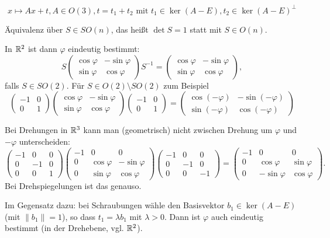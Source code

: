 \documentclass[
 a4paper,
 12pt,
 parskip=half
 ]{scrartcl}
\theoremstyle{plain}
\theoremstyle{definition}
\begin{document}
 \[ x \mapsto Ax + t, A \in O(3), t = t_1 + t_2 \text{ mit } t_1 \in \ker(A-E), t_2 \in \ker(A-E)^\bot \]

\begin{bem}
Äquivalenz über $S \in SO(n)$, das heißt $\det S=1$ statt mit $S \in O(n)$. 
 
 In $\mathbb{R}^2$ ist dann $\varphi$ eindeutig bestimmt:
 \[ S \begin{pmatrix} \cos \varphi & - \sin \varphi \\ \sin \varphi & \cos \varphi \end{pmatrix} S^{-1} = \begin{pmatrix} \cos \varphi & - \sin \varphi \\ \sin \varphi & \cos \varphi \end{pmatrix}, \]
 falls $S \in SO(2)$. Für $S \in O(2) \setminus SO(2)$ zum Beispiel
 \[ \begin{pmatrix} -1 & 0 \\ 0 & 1 \end{pmatrix}
    \begin{pmatrix} \cos \varphi & - \sin \varphi \\ \sin \varphi & \cos \varphi \end{pmatrix}
    \begin{pmatrix} -1 & 0 \\ 0 & 1 \end{pmatrix}
    = 
    \begin{pmatrix} \cos (-\varphi) & - \sin (-\varphi) \\ \sin (-\varphi) & \cos (-\varphi) \end{pmatrix} \]
 
 Bei Drehungen in $\mathbb{R}^3$ kann man (geometrisch) nicht zwischen Drehung um $\varphi$ und $-\varphi$ unterscheiden:
 \[ \begin{pmatrix} -1 & 0 & 0 \\ 0 & -1 & 0 \\ 0 & 0 & 1 \end{pmatrix}
    \begin{pmatrix} -1 & 0 & 0 \\ 0 & \cos \varphi & - \sin \varphi \\ 0 & \sin \varphi & \cos \varphi \end{pmatrix}
    \begin{pmatrix} -1 & 0 & 0 \\ 0 & -1 & 0 \\ 0 & 0 & -1 \end{pmatrix}
    =
    \begin{pmatrix} -1 & 0 & 0 \\ 0 & \cos \varphi & \sin \varphi \\ 0 & -\sin \varphi & \cos \varphi \end{pmatrix}.
 \]
 Bei Drehspiegelungen ist das genauso.
 
 Im Gegensatz dazu: bei Schraubungen wähle den Basisvektor $b_1 \in \ker(A-E)$ (mit $\|b_1\| = 1$), so dass $t_1 = \lambda b_1$ mit $\lambda > 0$. Dann ist $\varphi$ auch eindeutig bestimmt (in der Drehebene, vgl. $\mathbb{R}^2$).
\end{bem}
\end{document}
